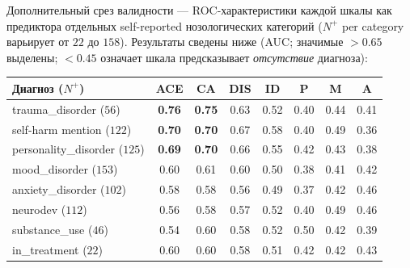 Дополнительный срез валидности --- ROC-характеристики каждой шкалы как предиктора отдельных self-reported нозологических категорий ($N^+$ per category варьирует от $22$ до $158$). Результаты сведены ниже (AUC; значимые $> 0.65$ выделены; $< 0.45$ означает шкала предсказывает \emph{отсутствие} диагноза):

\begin{center}
\small
\begin{tabular}{lccccccc}
\toprule
Диагноз ($N^+$)         & ACE  & CA   & DIS  & ID   & P    & M    & A    \\
\midrule
trauma\_disorder ($56$)      & \textbf{0.76} & \textbf{0.75} & 0.63 & 0.52 & 0.40 & 0.44 & 0.41 \\
self-harm mention ($122$)    & \textbf{0.70} & \textbf{0.70} & 0.67 & 0.58 & 0.40 & 0.49 & 0.36 \\
personality\_disorder ($125$) & \textbf{0.69} & \textbf{0.70} & 0.66 & 0.55 & 0.42 & 0.43 & 0.38 \\
mood\_disorder ($153$)        & 0.60 & 0.61 & 0.60 & 0.50 & 0.38 & 0.41 & 0.42 \\
anxiety\_disorder ($102$)     & 0.58 & 0.58 & 0.56 & 0.49 & 0.37 & 0.42 & 0.46 \\
neurodev ($112$)             & 0.56 & 0.58 & 0.57 & 0.52 & 0.40 & 0.49 & 0.46 \\
substance\_use ($46$)         & 0.54 & 0.60 & 0.58 & 0.52 & 0.50 & 0.42 & 0.39 \\
in\_treatment ($22$)          & 0.60 & 0.60 & 0.58 & 0.51 & 0.42 & 0.42 & 0.43 \\
\bottomrule
\end{tabular}
\end{center}

